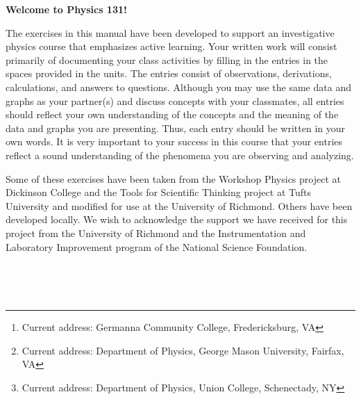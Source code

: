 \author{Matthew G. Belk}
\author{Emory F. Bunn}
\author{Mirela Fetea\footnote{Current address: Germanna Community College, Fredericksburg, VA}}
\author{Gerard P. Gilfoyle}
\author{Christine C. Helms}
\author{Henry Nebel}
\author{Philip D. Rubin\footnote{Current address: Department of Physics, George Mason University, Fairfax, VA}}
\author{Shaun Serej}
\author{Jack Singal}
\author{Matthew L. Trawick}
\author{Michael F. Vineyard\footnote{Current address: Department of Physics, Union College, Schenectady, NY}}

\maketitle

\vspace{0.8 in}


\begin{center}
\large{\textbf{Welcome to Physics 131!}}
\end{center}

The exercises in this manual have been developed to support an investigative
physics course that emphasizes active learning. 
Your written work will consist primarily of documenting
your class activities by filling in the entries in the spaces provided
in the units. The entries consist of observations, derivations, calculations,
and answers to questions. Although you may use the same data and graphs
as your partner(s) and discuss concepts with your classmates, all
entries should reflect your own understanding of the concepts and
the meaning of the data and graphs you are presenting. Thus, each
entry should be written in your own words. It is very important
to your success in this course that your entries reflect a sound understanding
of the phenomena you are observing and analyzing. 

Some of these exercises
have been taken from the Workshop Physics project at Dickinson College
and the Tools for Scientific Thinking project at Tufts University
and modified for use at the University of Richmond. Others have been
developed locally. 
We wish to acknowledge the support we have received for this project
from the University of Richmond and the Instrumentation and Laboratory
Improvement program of the National Science Foundation. 


\newpage
\
\thispagestyle{plain}

\newpage
\


